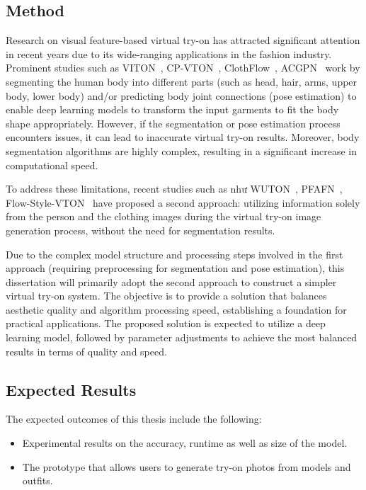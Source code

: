 \documentclass{article}[14pt]
\begin{document}
\subsection{Method}

Research on visual feature-based virtual try-on has attracted significant attention in recent years due to its wide-ranging applications in the fashion industry. Prominent studies such as VITON~\cite{Han-CVPR2018-Viton}, CP-VTON~\cite{Wang-ECCV2018-Toward}, ClothFlow~\cite{Han-ICCV2019-Clothflow}, ACGPN~\cite{Yang-CVPR2020-Towards} work by segmenting the human body into different parts (such as head, hair, arms, upper body, lower body) and/or predicting body joint connections (pose estimation) to enable deep learning models to transform the input garments to fit the body shape appropriately. However, if the segmentation or pose estimation process encounters issues, it can lead to inaccurate virtual try-on results. Moreover, body segmentation algorithms are highly complex, resulting in a significant increase in computational speed.

To address these limitations, recent studies such as như WUTON~\cite{Issenhuth-ECCV2020-Do}, PFAFN~\cite{Ge-CVPR2021-Parser}, Flow-Style-VTON~\cite{He-CVPR2022-Style} have proposed a second approach: utilizing information solely from the person and the clothing images during the virtual try-on image generation process, without the need for segmentation results.

Due to the complex model structure and processing steps involved in the first approach (requiring preprocessing for segmentation and pose estimation), this dissertation will primarily adopt the second approach to construct a simpler virtual try-on system. The objective is to provide a solution that balances aesthetic quality and algorithm processing speed, establishing a foundation for practical applications. The proposed solution is expected to utilize a deep learning model, followed by parameter adjustments to achieve the most balanced results in terms of quality and speed.


\subsection{Expected Results}
The expected outcomes of this thesis include the following:
\begin{itemize}
    \item Experimental results on the accuracy, runtime as well as size of the model.
    \item The prototype that allows users to generate try-on photos from models and outfits.
\end{itemize}
\end{document}
